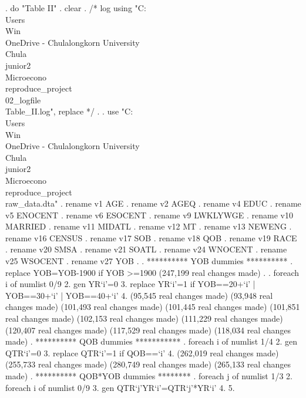 . do "Table II"
{\smallskip}
. clear
{\smallskip}
. /* log using "C:\\Users\\Win\\OneDrive - Chulalongkorn University\\Chula\\junior2\\Microecono\\reproduce_project\\02_logfile\\Table_II.log", replace  */
. 
. use "C:\\Users\\Win\\OneDrive - Chulalongkorn University\\Chula\\junior2\\Microecono\\reproduce_project\\raw_data.dta"
{\smallskip}
. rename v1 AGE
{\smallskip}
. rename v2 AGEQ
{\smallskip}
. rename v4 EDUC
{\smallskip}
. rename v5 ENOCENT
{\smallskip}
. rename v6 ESOCENT
{\smallskip}
. rename v9 LWKLYWGE
{\smallskip}
. rename v10 MARRIED
{\smallskip}
. rename v11 MIDATL
{\smallskip}
. rename v12 MT
{\smallskip}
. rename v13 NEWENG
{\smallskip}
. rename v16 CENSUS
{\smallskip}
. rename v17 SOB
{\smallskip}
. rename v18 QOB
{\smallskip}
. rename v19 RACE
{\smallskip}
. rename v20 SMSA
{\smallskip}
. rename v21 SOATL
{\smallskip}
. rename v24 WNOCENT
{\smallskip}
. rename v25 WSOCENT
{\smallskip}
. rename v27 YOB
{\smallskip}
. 
. **********  YOB dummies **********
. replace YOB=YOB-1900 if YOB >=1900
(247,199 real changes made)
{\smallskip}
. 
. foreach i of numlist 0/9 {\lbr}
  2. gen YR`i'=0
  3. replace YR`i'=1 if YOB==20+`i' | YOB==30+`i' | YOB==40+`i' 
  4. {\rbr}
(95,545 real changes made)
(93,948 real changes made)
(101,493 real changes made)
(101,445 real changes made)
(101,851 real changes made)
(102,153 real changes made)
(111,229 real changes made)
(120,407 real changes made)
(117,529 real changes made)
(118,034 real changes made)
{\smallskip}
. **********  QOB dummies ***********
. foreach i of numlist 1/4 {\lbr}
  2. gen QTR`i'=0
  3. replace QTR`i'=1 if QOB==`i'
  4. {\rbr}
(262,019 real changes made)
(255,733 real changes made)
(280,749 real changes made)
(265,133 real changes made)
{\smallskip}
. **********  QOB*YOB dummies ********
. foreach j of numlist 1/3 {\lbr}
  2. foreach i of numlist 0/9 {\lbr}
  3. gen QTR`j'YR`i'=QTR`j'*YR`i'
  4. {\rbr}
  5. {\rbr}
{\smallskip}
